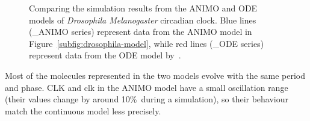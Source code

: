 \begin{figure}[!htb]
\begin{minipage}{\textwidth}
\begin{tabular}{ccc}
\end{tabular}
\caption{Comparing the simulation results from the ANIMO and ODE models of
\emph{Drosophila Melanogaster} circadian clock. Blue lines ({\sf \_{}ANIMO} series)
represent data from the ANIMO model in Figure~\ref{subfig:drosophila-model},
while red lines ({\sf \_{}ODE} series) represent data from the ODE model by~\citet{drosophila-ode-model}.\label{suppl-fig:grafici-drosophila}}
\end{minipage}
\end{figure}

Most of the molecules represented in the two models evolve with the same period and phase.
CLK and clk in the ANIMO model have
a small oscillation range (their values change by around 10\%\ during a simulation),
so their behaviour match the continuous model less precisely.
%
%
%
